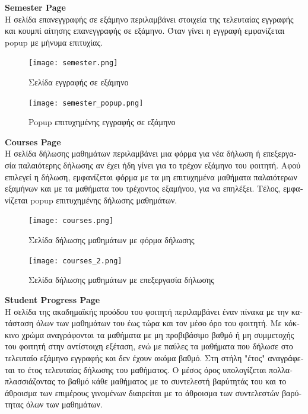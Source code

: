 \documentclass[manuscript,screen,review]{acmart}
\newcommand{\gr}[1]{\foreignlanguage{greek}{#1}}
\begin{document}
\textbf{Semester Page}
\\\gr{Η σελίδα επανεγγραφής σε εξάμηνο περιλαμβάνει στοιχεία της τελευταίας εγγραφής και κουμπί αίτησης επανεγγραφής σε εξάμηνο. Όταν γίνει η εγγραφή εμφανίζεται} popup \gr{με μήνυμα επιτυχίας.}

\begin{figure}[H]
    \centering
    \texttt{[image: semester.png]}
    \caption{\gr{Σελίδα εγγραφής σε εξάμηνο}}
    \label{fig:enter-label}
\end{figure}

\begin{figure}[H]
    \centering
    \texttt{[image: semester\_popup.png]}
    \caption{Popup \gr{επιτυχημένης εγγραφής σε εξάμηνο}}
    \label{fig:enter-label}
\end{figure}

\textbf{Courses Page}
\\\gr{Η σελίδα δήλωσης μαθημάτων περιλαμβάνει μια φόρμα για νέα δήλωση ή επεξεργασία παλαιότερης δήλωσης αν έχει ήδη γίνει για το τρέχον εξάμηνο του φοιτητή. Αφού επιλεγεί η δήλωση, εμφανίζεται φόρμα με τα μη επιτυχημένα μαθήματα παλαιότερων εξαμήνων και με τα μαθήματα του τρέχοντος εξαμήνου, για να επηλέξει. Τέλος, εμφανίζεται} popup \gr{επιτυχημένης δήλωσης μαθημάτων.}

\begin{figure}[H]
    \centering
    \texttt{[image: courses.png]}
    \caption{\gr{Σελίδα δήλωσης μαθημάτων με φόρμα δήλωσης}}
    \label{fig:enter-label}
\end{figure}

\begin{figure}[H]
    \centering
    \texttt{[image: courses\_2.png]}
    \caption{\gr{Σελίδα δήλωσης μαθημάτων με επεξεργασία δήλωσης}}
    \label{fig:enter-label}
\end{figure}

\textbf{Student Progress Page}
\\\gr{Η σελίδα της ακαδημαϊκής προόδου του φοιτητή περιλαμβάνει έναν πίνακα με την κατάσταση όλων των μαθημάτων του έως τώρα και τον μέσο όρο του φοιτητή. Με κόκκινο χρώμα αναγράφονται τα μαθήματα με μη προβιβάσιμο βαθμό ή μη συμμετοχής του φοιτητή στην αντίστοιχη εξέταση, ενώ με παύλες τα μαθήματα που δήλωσε στο τελευταίο εξάμηνο εγγραφής και δεν έχουν ακόμα βαθμό. Στη στήλη "έτος" αναγράφεται το έτος τελευταίας δήλωσης του μαθήματος. Ο μέσος όρος υπολογίζεται πολλαπλασσιάζοντας το βαθμό κάθε μαθήματος με το συντελεστή βαρύτητάς του και το άθροισμα των επιμέρους γινομένων διαιρείται με το άθροισμα των συντελεστών βαρύτητας όλων των μαθημάτων.}
\end{document}
